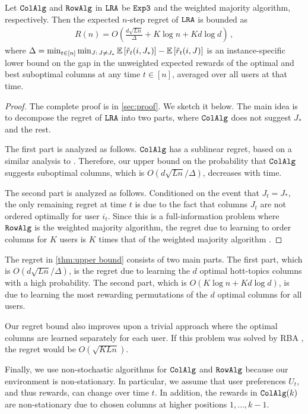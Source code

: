 
\begin{theorem}
\label{thm:upper bound} Let ${\tt ColAlg}$ and ${\tt RowAlg}$ in ${\tt LRA}$ be ${\tt Exp3}$ and the weighted majority algorithm, respectively. Then the expected $n$-step regret of ${\tt LRA}$ is bounded as
\begin{align*}
  R(n) =
  O\left(\frac{d \sqrt{L n}}{\Delta} + K \log n + K d \log d\right)\,,
\end{align*}
where $\Delta = \min_{t \in [n]} \min_{J:\, J \neq J_\ast} \mathbb{E}\left[\tilde{r}_t(i, J_\ast)\right] - \mathbb{E}\left[\tilde{r}_t(i, J)\right]$ is an instance-specific lower bound on the gap in the unweighted expected rewards of the optimal and best suboptimal columns at any time $t \in [n]$, averaged over all users at that time. 
\end{theorem}
\begin{proof}
The complete proof is in \cref{sec:proof}. We sketch it below. The main idea is to decompose the regret of ${\tt LRA}$ into two parts, where ${\tt ColAlg}$ does not suggest $J_\ast$ and the rest.

The first part is analyzed as follows. ${\tt ColAlg}$ has a sublinear regret, based on a similar analysis to \citet{radlinski2008learning}. Therefore, our upper bound on the probability that ${\tt ColAlg}$ suggests suboptimal columns, which is $O(d \sqrt{L n} / \Delta)$, decreases with time.

The second part is analyzed as follows. Conditioned on the event that $J_t = J_\ast$, the only remaining regret at time $t$ is due to the fact that columns $J_t$ are not ordered optimally for user $i_t$. Since this is a full-information problem where ${\tt RowAlg}$ is the weighted majority algorithm, the regret due to learning to order columns for $K$ users is $K$ times that of the weighted majority algorithm \citep*{littlestone1994weighted}.
\end{proof}

The regret in \cref{thm:upper bound} consists of two main parts. The first part, which is $O(d \sqrt{L n} / \Delta)$, is the regret due to learning the $d$ optimal hott-topics columns with a high probability. The second part, which is $O(K \log n + K d \log d)$, is due to learning the most rewarding permutations of the $d$ optimal columns for all users.

Our regret bound also improves upon a trivial approach where the optimal columns are learned separately for each user. If this problem was solved by RBA \citep{radlinski2008learning}, the regret would be $O(\sqrt{K L n})$.

Finally, we use non-stochastic algorithms for ${\tt ColAlg}$ and ${\tt RowAlg}$ because our environment is non-stationary. In particular, we assume that user preferences $U_t$, and thus rewards, can change over time $t$. In addition, the rewards in ${\tt ColAlg}(k)$ are non-stationary due to chosen columns at higher positions $1, \dots, k - 1$.
